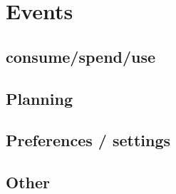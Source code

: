 \section{Events}
\subsection{consume/spend/use}
\subsection{Planning}
\subsection{Preferences / settings}
\subsection{Other}